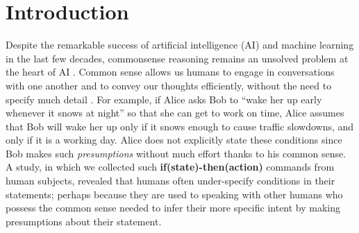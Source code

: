 \section{Introduction}
Despite the remarkable success of artificial intelligence (AI) and machine learning in the last few decades, commonsense reasoning remains an unsolved problem at the heart of AI \cite{levesque2012winograd,davis2015commonsense,sakaguchi2019winogrande}. 
Common sense allows us humans to engage in conversations with one another and to convey our thoughts efficiently, without the need to specify much detail \cite{grice1975logic}. For example, if Alice asks Bob to ``wake her up early whenever it snows at night'' so that she can get to work on time, Alice assumes that Bob will wake her up only if it snows enough to cause traffic slowdowns, and only if it is a working day. Alice does not explicitly state these conditions since Bob makes such \emph{presumptions} without much effort thanks to his common sense.
A study, in which we collected such {\bf if(state)-then(action)} commands
from human subjects, revealed that humans often under-specify conditions in their statements; perhaps because they are used to speaking with other humans who possess the common sense needed to infer their more specific intent by making presumptions about their statement.

